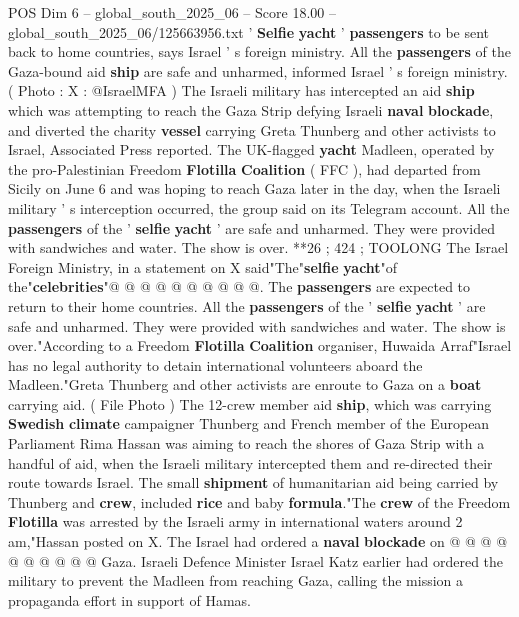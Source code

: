 \begin{textsample}{POS Dim 6 – global\_south\_2025\_06 – Score 18.00 – global\_south\_2025\_06/125663956.txt}  \label{ex:f6_pos_002}
' \textbf{Selfie} \textbf{yacht} ' \textbf{passengers} to be sent back to home countries, says Israel ' s foreign ministry.
All the \textbf{passengers} of the Gaza-bound aid \textbf{ship} are safe and unharmed, informed Israel ' s foreign ministry. ( Photo : X : @IsraelMFA ) The Israeli military has intercepted an aid \textbf{ship} which was attempting to reach the Gaza Strip defying Israeli \textbf{naval} \textbf{blockade}, and diverted the charity \textbf{vessel} carrying Greta Thunberg and other activists to Israel, Associated Press reported.
The UK-flagged \textbf{yacht} Madleen, operated by the pro-Palestinian Freedom \textbf{Flotilla} \textbf{Coalition} ( FFC ), had departed from Sicily on June 6 and was hoping to reach Gaza later in the day, when the Israeli military ' s interception occurred, the group said on its Telegram account.
All the \textbf{passengers} of the ' \textbf{selfie} \textbf{yacht} ' are safe and unharmed.
They were provided with sandwiches and water.
The show is over. **26 ; 424 ; TOOLONG The Israel Foreign Ministry, in a statement on X said"The"\textbf{selfie} \textbf{yacht}"of the"\textbf{celebrities}"@ @ @ @ @ @ @ @ @ @.
The \textbf{passengers} are expected to return to their home countries.
All the \textbf{passengers} of the ' \textbf{selfie} \textbf{yacht} ' are safe and unharmed.
They were provided with sandwiches and water.
The show is over."According to a Freedom \textbf{Flotilla} \textbf{Coalition} organiser, Huwaida Arraf"Israel has no legal authority to detain international volunteers aboard the Madleen."Greta Thunberg and other activists are enroute to Gaza on a \textbf{boat} carrying aid. ( File Photo ) The 12-crew member aid \textbf{ship}, which was carrying \textbf{Swedish} \textbf{climate} campaigner Thunberg and French member of the European Parliament Rima Hassan was aiming to reach the shores of Gaza Strip with a handful of aid, when the Israeli military intercepted them and re-directed their route towards Israel.
The small \textbf{shipment} of humanitarian aid being carried by Thunberg and \textbf{crew}, included \textbf{rice} and baby \textbf{formula}."The \textbf{crew} of the Freedom \textbf{Flotilla} was arrested by the Israeli army in international waters around 2 am,"Hassan posted on X.
The Israel had ordered a \textbf{naval} \textbf{blockade} on @ @ @ @ @ @ @ @ @ @ Gaza.
Israeli Defence Minister Israel Katz earlier had ordered the military to prevent the Madleen from reaching Gaza, calling the mission a propaganda effort in support of Hamas.

\end{textsample}
